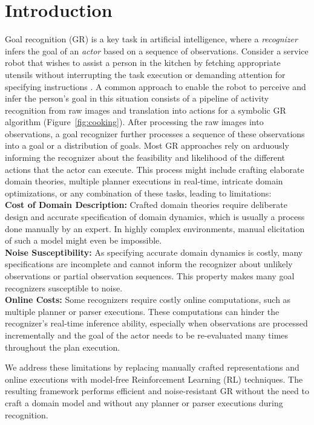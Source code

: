 \documentclass[letterpaper]{article} %
\begin{document}
\section*{Introduction}
\label{sec:intro}
Goal recognition (GR) is a key task in artificial intelligence, where a \textit{recognizer} infers the goal of an \textit{actor} based on a sequence of observations. 
Consider a service robot that wishes to assist a person in the kitchen by fetching appropriate utensils without interrupting the task execution or demanding attention for specifying instructions \cite{kautz1986generalized,Monteiro2017,granada2020object,bishop2020chaopt}. 
A common approach to enable the robot to perceive and infer the person's goal in this situation consists of a pipeline of activity recognition from raw images and translation into actions for a symbolic GR algorithm (Figure~\ref{fig:cooking}). 
After processing the raw images into observations, a goal recognizer further processes a sequence of these observations into a goal or a distribution of goals. 
Most GR approaches rely on arduously informing the recognizer about the feasibility and likelihood of the different actions that the actor can execute. 
This process might include crafting elaborate domain theories, multiple planner executions in real-time, intricate domain optimizations, or any combination of these tasks, leading to limitations:\\
%
%
%
%
%
%
%
%
\textbf{Cost of Domain Description:} Crafted domain theories require deliberate design and accurate specification of domain dynamics, which is usually a process done manually by an expert. 
In highly complex environments, manual elicitation of such a model might even be impossible.\\
\textbf{Noise Susceptibility:} As specifying accurate domain dynamics is costly, many specifications are incomplete and cannot inform the recognizer about unlikely observations or partial observation sequences. 
This property makes many goal recognizers susceptible to noise. \\
\textbf{Online Costs:} Some recognizers require costly online computations, such as multiple planner or parser executions. These computations can hinder the recognizer's real-time inference ability, especially when observations are processed incrementally and the goal of the actor needs to be re-evaluated many times throughout the plan execution.

We address these limitations by replacing manually crafted representations and online executions with model-free Reinforcement Learning (RL) techniques.
The resulting framework performs efficient and noise-resistant GR without the need to craft a domain model and without any planner or parser executions during recognition. 
\end{document}
